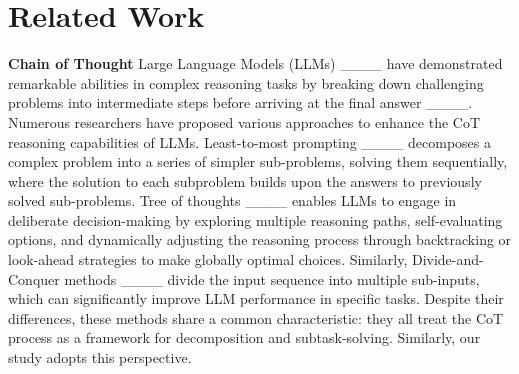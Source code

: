 \section{Related Work}


\textbf{Chain of Thought}
Large Language Models (LLMs) ____ have demonstrated remarkable abilities in complex reasoning tasks by breaking down challenging problems into intermediate steps before arriving at the final answer ____. Numerous researchers have proposed various approaches to enhance the CoT reasoning capabilities of LLMs. Least-to-most prompting ____ decomposes  a complex problem into a series of simpler sub-problems, solving them sequentially, where the solution to each subproblem builds upon the answers to previously solved sub-problems. Tree of thoughts ____ enables LLMs to engage in deliberate decision-making by exploring multiple reasoning paths, self-evaluating options, and dynamically adjusting the reasoning process through backtracking or look-ahead strategies to make globally optimal choices. Similarly, Divide-and-Conquer methods ____ divide the input sequence into multiple sub-inputs, which can significantly improve LLM performance in specific tasks. Despite their differences, these methods share a common characteristic: they all treat the CoT process as a framework for decomposition and subtask-solving. Similarly, our study adopts this perspective. 


